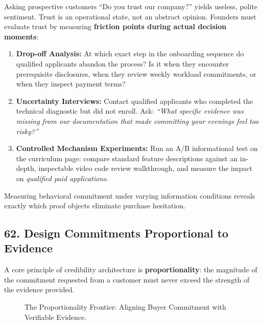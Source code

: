 Asking prospective customers ``Do you trust our company?'' yields useless, polite sentiment. Trust is an operational state, not an abstract opinion. Founders must evaluate trust by measuring \textbf{friction points during actual decision moments}:
\begin{enumerate}
\item \textbf{Drop-off Analysis:} At which exact step in the onboarding sequence do qualified applicants abandon the process? Is it when they encounter prerequisite disclosures, when they review weekly workload commitments, or when they inspect payment terms?
\item \textbf{Uncertainty Interviews:} Contact qualified applicants who completed the technical diagnostic but did not enroll. Ask: \emph{``What specific evidence was missing from our documentation that made committing your evenings feel too risky?''}
\item \textbf{Controlled Mechanism Experiments:} Run an A/B informational test on the curriculum page: compare standard feature descriptions against an in-depth, inspectable video code review walkthrough, and measure the impact on \emph{qualified paid applications}.
\end{enumerate}

Measuring behavioral commitment under varying information conditions reveals exactly which proof objects eliminate purchase hesitation.

\subsection*{62. Design Commitments Proportional to Evidence}

A core principle of credibility architecture is \textbf{proportionality}: the magnitude of the commitment requested from a customer must never exceed the strength of the evidence provided.

\begin{figure}[htbp]
\centering
{}
\caption{The Proportionality Frontier: Aligning Buyer Commitment with Verifiable Evidence.}
\label{fig:proportionality}
\end{figure}

